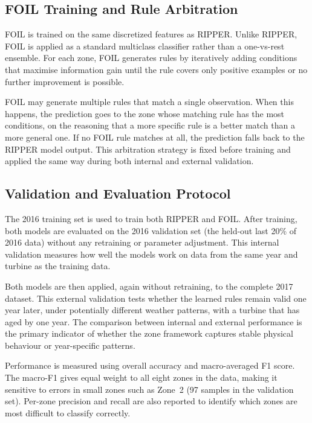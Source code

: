 \subsection{FOIL Training and Rule Arbitration}
\label{subsec:ch3:foil}

FOIL is trained on the same discretized features as RIPPER. Unlike RIPPER, FOIL is
applied as a standard multiclass classifier rather than a one-vs-rest ensemble. For each
zone, FOIL generates rules by iteratively adding conditions that maximise information
gain until the rule covers only positive examples or no further improvement is possible.

FOIL may generate multiple rules that match a single observation. When this happens, the
prediction goes to the zone whose matching rule has the most conditions, on the reasoning
that a more specific rule is a better match than a more general one. If no FOIL rule
matches at all, the prediction falls back to the RIPPER model output. This arbitration
strategy is fixed before training and applied the same way during both internal and
external validation.

\subsection{Validation and Evaluation Protocol}
\label{subsec:ch3:eval}

The 2016 training set is used to train both RIPPER and FOIL. After training, both models
are evaluated on the 2016 validation set (the held-out last 20\% of 2016 data) without
any retraining or parameter adjustment. This internal validation measures how well the
models work on data from the same year and turbine as the training data.

Both models are then applied, again without retraining, to the complete 2017 dataset.
This external validation tests whether the learned rules remain valid one year later,
under potentially different weather patterns, with a turbine that has aged by one year.
The comparison between internal and external performance is the primary indicator of
whether the zone framework captures stable physical behaviour or year-specific patterns.

Performance is measured using overall accuracy and macro-averaged F1 score. The macro-F1
gives equal weight to all eight zones in the data, making it sensitive to errors in small
zones such as Zone~2 (97 samples in the validation set). Per-zone precision and recall
are also reported to identify which zones are most difficult to classify correctly.

